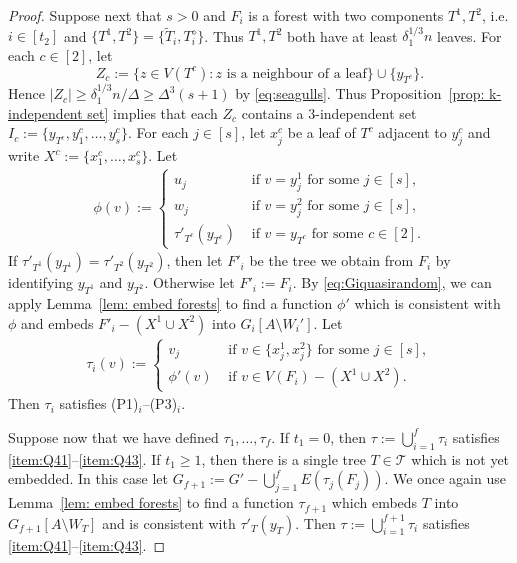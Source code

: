 \documentclass[a4paper, 11pt, reqno]{amsart}
\numberwithin{equation}{section}
\newcommand{\1}{{\rm 1\hspace*{-0.4ex}%
\rule{0.1ex}{1.52ex}\hspace*{0.2ex}}}
\newcommand{\cT}{\mathcal{T}}
\newcommand{\sm}{\setminus}
\begin{document}
\begin{proof}
Suppose next that $s>0$ and $F_i$ is a forest with two components $T^1,T^2$, i.e. $i\in [t_2]$ and $\{T^1,T^2\}=\{\tilde{T}_i,T_i^\diamond\}$.
Thus $T^1,T^2$ both have at least $\delta_1^{1/3} n$ leaves.
For each $c\in[2]$, let 
$$Z_c := \{z \in V(T^c): z\text{ is a neighbour of a leaf}\}\cup \{y_{T^{c}}\}.$$
Hence $|Z_c|\geq \delta_1^{1/3} n/\Delta \geq \Delta^{3} (s+1)$ by \eqref{eq:seagulls}.
Thus Proposition~\ref{prop: k-independent set}
implies that each $Z_c$ contains a $3$-independent set $I_c:=\{y_{T^c},y^c_1,\dots, y^c_{s}\}$. 
For each $j\in [s]$, let $x_j^c$ be a leaf of $T^c$ adjacent to $y_j^c$ and write $X^c:=\{x_1^c,\dots,x_s^c\}$.
Let 
\begin{align*}
\phi(v):= \left\{ \begin{array}{ll}
u_j &\text{ if } v=y^1_j \text{ for some } j\in[s],\\
w_j &\text{ if } v=y^2_j \text{ for some } j\in[s],\\
\tau'_{T^c}(y_{T^c}) &\text{ if } v= y_{T^c} \text{ for some } c\in[2].
\end{array}\right.
\end{align*}
If $\tau'_{T^1}(y_{T^1})= \tau'_{T^2}(y_{T^2})$, then let $F'_i$ be the tree we obtain from $F_i$ by identifying $y_{T^1}$ and $y_{T^2}$. 
Otherwise let $F'_i:=F_i$.  
By \eqref{eq:Giquasirandom}, 
we can apply Lemma~\ref{lem: embed forests} to find
a function $\phi'$ which is consistent with $\phi$ and embeds $F'_i-(X^1\cup X^2)$ into $G_i[A\sm W_i']$.
Let
\begin{align*}
\tau_i(v):= \left\{ \begin{array}{ll}
v_j &\text{ if } v\in \{x_j^1,x_j^2\}\text{ for some } j\in[s],\\
\phi'(v) &\text{ if } v\in V(F_i)- (X^1 \cup X^2).
\end{array}\right.
\end{align*}
Then $\tau_i$ satisfies (P1)$_{i}$--(P3)$_{i}$.

Suppose now that we have defined $\tau_1,\dots,\tau_f$.
If $t_1= 0$, 
then $\tau:= \bigcup_{i=1}^{f} \tau_i$ satisfies \ref{item:Q41}--\ref{item:Q43}.
If $t_1\geq 1$, then there is a single tree $T\in \cT$ which is not yet embedded.
In this case 
let $G_{f+1}:= G'-\bigcup_{j=1}^{f} E(\tau_j(F_j))$.
We once again use Lemma~\ref{lem: embed forests} to find a function $\tau_{f+1}$ which embeds $T$ into $G_{f+1}[A\sm W_T]$ and is consistent with $\tau'_{T}(y_T)$.
Then $\tau:= \bigcup_{i=1}^{f+1} \tau_i$ satisfies \ref{item:Q41}--\ref{item:Q43}.
\end{proof}
\end{document}
